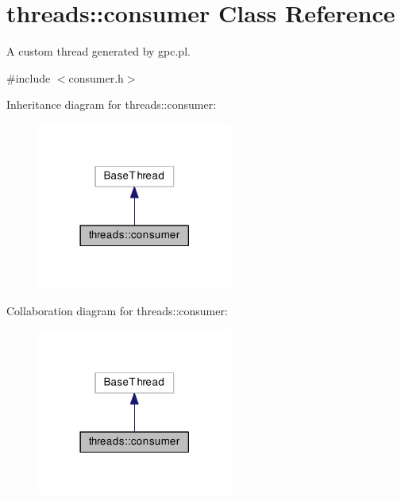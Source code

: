 \hypertarget{classthreads_1_1consumer}{}\section{threads\+:\+:consumer Class Reference}
\label{classthreads_1_1consumer}


A custom thread generated by gpc.\+pl.  




{\ttfamily \#include $<$consumer.\+h$>$}



Inheritance diagram for threads\+:\+:consumer\+:\nopagebreak
\begin{figure}[H]
\begin{center}
\leavevmode
\includegraphics[width=182pt]{dd/dc0/classthreads_1_1consumer__inherit__graph}
\end{center}
\end{figure}


Collaboration diagram for threads\+:\+:consumer\+:\nopagebreak
\begin{figure}[H]
\begin{center}
\leavevmode
\includegraphics[width=182pt]{d2/de3/classthreads_1_1consumer__coll__graph}
\end{center}
\end{figure}
